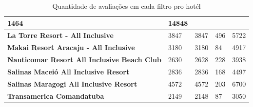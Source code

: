 \begin{table}[]
\begin{tabular}{|p{5cm}|l|l|l|l|}
		1464                                                &
		14848                                                 \\
		\hline
		\textbf{La Torre Resort - All Inclusive}            &
		3847                                                &
		3847                                                &
		496                                                 &
		5722                                                  \\
		\hline
		\textbf{Makai Resort Aracaju - All Inclusive}       &
		3180                                                &
		3180                                                &
		84                                                  &
		4917                                                  \\
		\hline
		\textbf{Nauticomar Resort All Inclusive Beach Club} &
		2630                                                &
		2628                                                &
		228                                                 &
		3938                                                  \\
		\hline
		\textbf{Salinas Maceió All Inclusive Resort}        &
		2836                                                &
		2836                                                &
		168                                                 &
		4497                                                  \\
		\hline
		\textbf{Salinas Maragogi All Inclusive Resort}      &
		4572                                                &
		4572                                                &
		203                                                 &
		6700                                                  \\
		\hline
		\textbf{Transamerica Comandatuba}                   &
		2149                                                &
		2148                                                &
		87                                                  &
		3050                                                  \\ \hline
	\end{tabular}
	\caption{Quantidade de avaliações em cada filtro pro hotél}
	\label{table:qtd_review_filtro}
\end{table}

